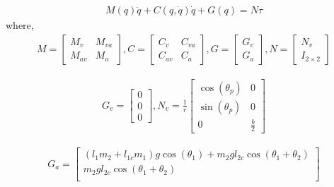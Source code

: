 \documentclass{article}
\begin{document}
\begin{equation}
	\begin{aligned}
		M(q)\ddot q + C(q,\dot q) \dot q + G(q) = N \tau
	\end{aligned}
\end{equation}
where,
\begin{equation}
	\begin{aligned}
		M = 
		\begin{bmatrix}
			M_v& M_{va} \\
			M_{av} & M_a
		\end{bmatrix}, C =
		\begin{bmatrix}
			C_v& C_{va} \\
			C_{av} & C_a
		\end{bmatrix}, G =
		\begin{bmatrix}
			G_v \\
			G_a
		\end{bmatrix}, N =
		\begin{bmatrix}
			N_v \\
			I_{2\times2}
		\end{bmatrix}
	\end{aligned}
\end{equation}

\begin{equation}
	\begin{aligned}
	G_v =
	\begin{bmatrix}
		0\\
		0 \\
		0 
	\end{bmatrix},N_v = \frac{1}{r}
	\begin{bmatrix}
		\cos(\theta_p)& 0 \\
		\sin(\theta_p)& 0 \\
		0 & \frac{b}{2}
	\end{bmatrix} 
	\end{aligned}
\end{equation}

\begin{equation}
	\begin{aligned}
	G_a =
	\begin{bmatrix}
		(l_1 m_2 + l_{1c} m_1) g \cos(\theta_1) + m_2 g l_{2c} \cos(\theta_1 + \theta_2)\\
		m_2 g l_{2c} \cos(\theta_1 + \theta_2)\\
	\end{bmatrix}
	\end{aligned}
\end{equation}
\end{document}
